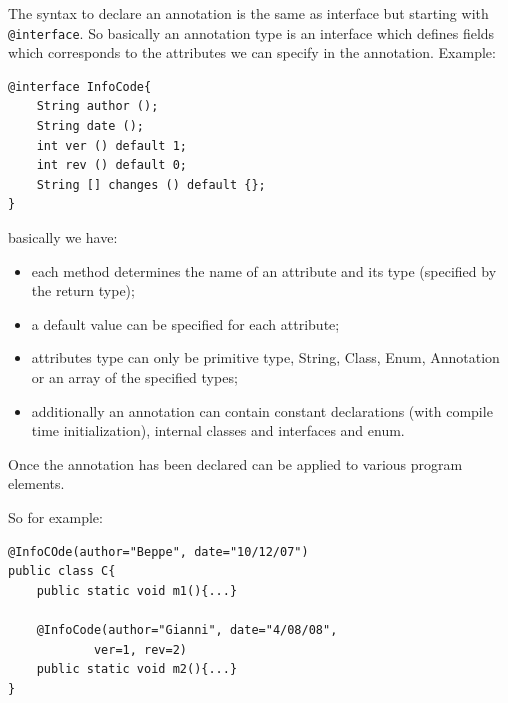 The syntax to declare an annotation is the same as interface but starting with \verb|@interface|.
So basically an annotation type is an interface which defines fields which corresponds to the attributes we can specify in the annotation.
Example:
\begin{verbatim}
@interface InfoCode{
    String author ();
    String date ();
    int ver () default 1;
    int rev () default 0;
    String [] changes () default {};
}
\end{verbatim}
basically we have:
\begin{itemize}
    \item each method determines the name of an attribute and its type (specified by the return type);
    \item a default value can be specified for each attribute;
    \item attributes type can only be primitive type, String, Class, Enum, Annotation or an array of the specified types;
    \item additionally an annotation can contain constant declarations (with compile time initialization), internal classes and interfaces and enum.
\end{itemize}
Once the annotation has been declared can be applied to various program elements.

So for example:
\begin{verbatim}
@InfoCOde(author="Beppe", date="10/12/07")
public class C{
    public static void m1(){...}

    @InfoCode(author="Gianni", date="4/08/08",
            ver=1, rev=2)
    public static void m2(){...}
}
\end{verbatim}

